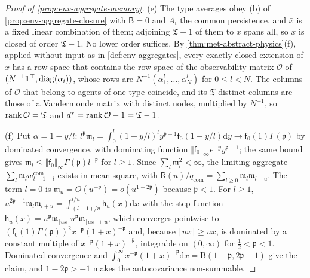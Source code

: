 \begin{proof}[Proof of \cref{prop:env-aggregate-memory}]
(e) The type averages obey (b) of \cref{prop:env-aggregate-closure} with $\mathsf B=0$ and $A_{\mathfrak t}$ the common persistence, and $\bar x$ is a fixed linear combination of them; adjoining $\mathfrak T-1$ of them to $\bar x$ spans all, so $\bar x$ is closed of order $\mathfrak T-1$. No lower order suffices. By \cref{thm:met-abstract-physics}(f), applied without input as in \cref{def:env-aggregates}, every exactly closed extension of $\bar x$ has a row space that contains the row space of the observability matrix $\mathcal O$ of $(N^{-1}\mathbf{1}^\top,\operatorname{diag}(\alpha_i))$, whose rows are $N^{-1}(\alpha_1^l,\dots,\alpha_N^l)$ for $0\le l<N$. The columns of $\mathcal O$ that belong to agents of one type coincide, and its $\mathfrak T$ distinct columns are those of a Vandermonde matrix with distinct nodes, multiplied by $N^{-1}$, so $\operatorname{rank}\mathcal O=\mathfrak T$ and $d^\ast=\operatorname{rank}\mathcal O-1=\mathfrak T-1$.

(f) Put $\alpha=1-y/l$: $l^{\mathfrak p}\mathfrak m_l=\int_0^l(1-y/l)^ly^{\mathfrak p-1}\mathsf f_0(1-y/l)\mathrm dy\to\mathsf f_0(1)\Gamma(\mathfrak p)$ by dominated convergence, with dominating function $\Vert\mathsf f_0\Vert_\infty e^{-y}y^{\mathfrak p-1}$; the same bound gives $\mathfrak m_l\le\Vert\mathsf f_0\Vert_\infty\Gamma(\mathfrak p)l^{-\mathfrak p}$ for $l\ge1$. Since $\sum_l\mathfrak m_l^2<\infty$, the limiting aggregate $\sum_l\mathfrak m_lw^{\mathrm{com}}_{t-1-l}$ exists in mean square, with $\mathsf R(u)/q_{\mathrm{com}}=\sum_{l\ge0}\mathfrak m_l\mathfrak m_{l+u}$. The term $l=0$ is $\mathfrak m_u=O(u^{-\mathfrak p})=o(u^{1-2\mathfrak p})$ because $\mathfrak p<1$. For $l\ge1$, $u^{2\mathfrak p-1}\mathfrak m_l\mathfrak m_{l+u}=\int_{(l-1)/u}^{l/u}\mathsf h_u(x)\mathrm dx$ with the step function $\mathsf h_u(x)=u^{\mathfrak p}\mathfrak m_{\lceil ux\rceil}u^{\mathfrak p}\mathfrak m_{\lceil ux\rceil+u}$, which converges pointwise to $(\mathsf f_0(1)\Gamma(\mathfrak p))^2x^{-\mathfrak p}(1+x)^{-\mathfrak p}$ and, because $\lceil ux\rceil\ge ux$, is dominated by a constant multiple of $x^{-\mathfrak p}(1+x)^{-\mathfrak p}$, integrable on $(0,\infty)$ for $\frac12<\mathfrak p<1$. Dominated convergence and $\int_0^\infty x^{-\mathfrak p}(1+x)^{-\mathfrak p}\mathrm dx=\mathrm B(1-\mathfrak p,2\mathfrak p-1)$ give the claim, and $1-2\mathfrak p>-1$ makes the autocovariance non-summable.
\end{proof}

